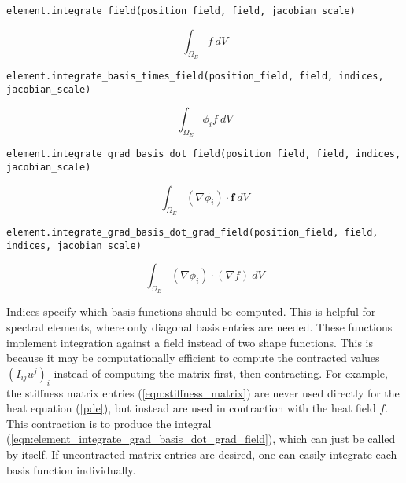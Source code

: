 \begin{verbatim}
element.integrate_field(position_field, field, jacobian_scale)
\end{verbatim}

\begin{equation}
\int_{\Omega_E} f~dV
\label{eqn:element_integrate_field}
\end{equation}

\begin{verbatim}
element.integrate_basis_times_field(position_field, field, indices, jacobian_scale)
\end{verbatim}

\begin{equation}
\int_{\Omega_E} \phi_i f~dV
\label{eqn:element_integrate_basis_times_field}
\end{equation}

\begin{verbatim}
element.integrate_grad_basis_dot_field(position_field, field, indices, jacobian_scale)
\end{verbatim}

\begin{equation}
\int_{\Omega_E} (\nabla \phi_i)\cdot \mathbf{f}~dV
\label{eqn:element_integrate_grad_basis_dot_field}
\end{equation}

\begin{verbatim}
element.integrate_grad_basis_dot_grad_field(position_field, field, indices, jacobian_scale)
\end{verbatim}

\begin{equation}
\int_{\Omega_E} (\nabla \phi_i)\cdot (\nabla f)~dV
\label{eqn:element_integrate_grad_basis_dot_grad_field}
\end{equation}

Indices specify which basis functions should be computed. This is helpful for spectral elements, where only diagonal basis entries are needed. These functions implement integration against a field instead of two shape functions. This is because it may be computationally efficient to compute the contracted values $(I_{ij}u^j)_i$ instead of computing the matrix first, then contracting. For example, the stiffness matrix entries (\ref{eqn:stiffness_matrix}) are never used directly for the heat equation (\ref{pde}), but instead are used in contraction with the heat field $f$. This contraction is to produce the integral (\ref{eqn:element_integrate_grad_basis_dot_grad_field}), which can just be called by itself. If uncontracted matrix entries are desired, one can easily integrate each basis function individually.


